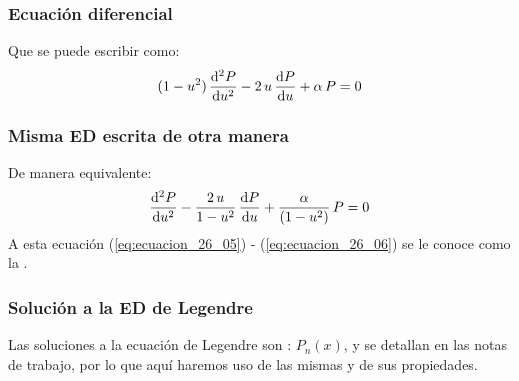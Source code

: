 \documentclass[12pt]{beamer}
\begin{document}
\begin{frame}
\frametitle{Ecuación diferencial}
Que se puede escribir como:
\pause
\begin{align}
(1 - u^{2}) \, \dv[2]{P}{u} - 2 \, u \, \dv{P}{u} + \alpha \, P = 0
\label{eq:ecuacion_26_05}
\end{align}
\end{frame}
\begin{frame}
\frametitle{Misma ED escrita de otra manera}
De manera equivalente:
\pause
\begin{align}
\dv[2]{P}{u} - \dfrac{2 \, u}{1 - u^{2}} \, \dv{P}{u} + \dfrac{\alpha}{(1 - u^{2})} \, P = 0
\label{eq:ecuacion_26_06}
\end{align}
A esta ecuación (\ref{eq:ecuacion_26_05}) - (\ref{eq:ecuacion_26_06}) se le conoce como la .
\end{frame}
\begin{frame}
\frametitle{Solución a la ED de Legendre}
Las soluciones a la ecuación de Legendre son : $P_{n} (x)$, y se detallan en las notas de trabajo, por lo que aquí haremos uso de las mismas y de sus propiedades.
\end{frame}




\end{document}

